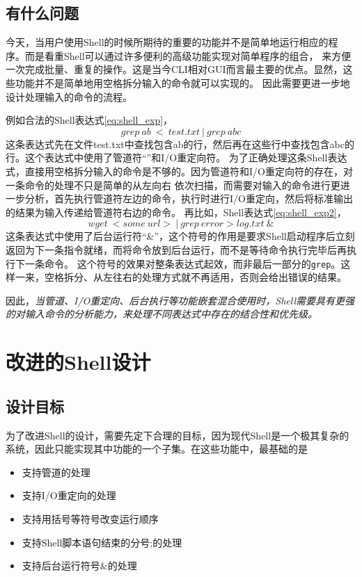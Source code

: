 \documentclass[a4paper,twoside]{article}
\begin{document}
\begin{spacing}{1.2}
\subsection{有什么问题}

今天，当用户使用Shell的时候所期待的重要的功能并不是简单地运行相应的程序。而是看重Shell可以通过许多便利的高级功能实现对简单程序的组合，
来方便一次完成批量、重复的操作。这是当今CLI相对GUI而言最主要的优点。显然，这些功能并不是简单地用空格拆分输入的命令就可以实现的。
因此需要更进一步地设计处理输入的命令的流程。

例如合法的Shell表达式\eqref{eq:shell_exp}，
\begin{equation}
	\label{eq:shell_exp}
grep \ ab \ < \ test.txt \ | \ grep \ abc
\end{equation}
这条表达式先在文件test.txt中查找包含ab的行，然后再在这些行中查找包含abc的行。这个表达式中使用了管道符“\textbar”和I/O重定向符。
为了正确处理这条Shell表达式，直接用空格拆分输入的命令是不够的。因为管道符和I/O重定向符的存在，对一条命令的处理不只是简单的从左向右
依次扫描，而需要对输入的命令进行更进一步分析，首先执行管道符左边的命令，执行时进行I/O重定向，然后将标准输出的结果为输入传递给管道符右边的命令。
再比如，Shell表达式\eqref{eq:shell_exp2}，
\begin{equation}
	\label{eq:shell_exp2}
wget \ <some \ url> \ | \ grep \ error > log.txt \ \&
\end{equation}
这条表达式中使用了后台运行符“\&”，这个符号的作用是要求Shell启动程序后立刻返回为下一条指令就绪，而将命令放到后台运行，而不是等待命令执行完毕后再执行下一条命令。
这个符号的效果对整条表达式起效，而非最后一部分的\texttt{grep}。这样一来，空格拆分、从左往右的处理方式就不再适用，否则会给出错误的结果。

因此，\emph{当管道、I/O重定向、后台执行等功能嵌套混合使用时，Shell需要具有更强的对输入命令的分析能力，来处理不同表达式中存在的结合性和优先级。}

\section{改进的Shell设计}

\subsection{设计目标}

为了改进Shell的设计，需要先定下合理的目标，因为现代Shell是一个极其复杂的系统，因此只能实现其中功能的一个子集。在这些功能中，最基础的是

\begin{itemize}
	\item 支持管道的处理
	\item 支持I/O重定向的处理
	\item 支持用括号等符号改变运行顺序
	\item 支持Shell脚本语句结束的分号;的处理
	\item 支持后台运行符号$\&$的处理
\end{itemize}


\end{spacing}
\end{document}
